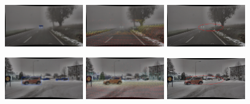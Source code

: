 \documentclass[report.tex]{subfiles}
\begin{document}
\begin{figure}[ht!]
            \includegraphics[width=0.3\textwidth]{images/datasets/dense/samples/dense_fog/2018-10-29_15-02-37_00580.png}\hfill
            \includegraphics[width=0.3\textwidth]{images/datasets/dense/samples/dense_fog/dense_LiDAR.png}\hfill
            \includegraphics[width=0.3\textwidth]{images/datasets/dense/samples/dense_fog/dense_Radar_ann.png}
          
            \includegraphics[width=0.3\textwidth]{images/datasets/dense/samples/snow/2018-02-07_11-56-57_00520.png}\hfill
            \includegraphics[width=0.3\textwidth]{images/datasets/dense/samples/snow/snow_LiDAR.png}\hfill
            \includegraphics[width=0.3\textwidth]{images/datasets/dense/samples/snow/snow_Radar_ann.png}
          

\end{figure}
\end{document}

